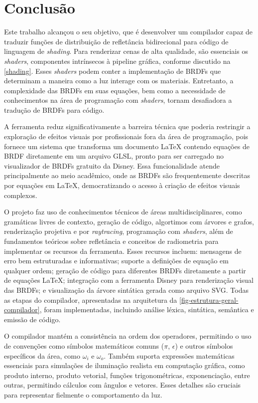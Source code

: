 
\chapter{Conclusão} \label{chapter-conclusion}

Este trabalho alcançou o seu objetivo, que é desenvolver um compilador capaz de traduzir funções de distribuição de refletância bidirecional para código de linguagem de \textit{shading}. Para renderizar cenas de alta qualidade, são essenciais os \textit{shaders}, componentes intrínsecos à pipeline gráfica, conforme discutido na \autoref{shading}. Esses \textit{shaders} podem conter a implementação de BRDFs que determinam a maneira como a luz interage com os materiais. Entretanto, a complexidade das BRDFs em suas equações, bem como a necessidade de conhecimentos na área de programação com \textit{shaders}, tornam desafiadora a tradução de BRDFs para código.

A ferramenta reduz significativamente a barreira técnica que poderia restringir a exploração de efeitos visuais por profissionais fora da área de programação, pois fornece um sistema que transforma um documento \LaTeX{} contendo equações de BRDF diretamente em um arquivo GLSL, pronto para ser carregado no visualizador de BRDFs gratuito da Disney. Essa funcionalidade atende principalmente ao meio acadêmico, onde as BRDFs são frequentemente descritas por equações em \LaTeX{}, democratizando o acesso à criação de efeitos visuais complexos.

O projeto faz uso de conhecimentos técnicos de áreas multidisciplinares, como gramáticas livres de contexto, geração de código, algortimos com árvores e grafos, renderização projetiva e por \textit{raytracing}, programação com \textit{shaders}, além de fundamentos teóricos sobre refletância e conceitos de radiometria para implementar os recursos da ferramenta. Esses recursos incluem: mensagens de erro bem estruturadas e informativas; suporte a definições de equação em qualquer ordem; geração de código para diferentes BRDFs diretamente a partir de equações \LaTeX{}; integração com a ferramenta Disney para renderização visual das BRDFs; e visualização da árvore sintática gerada como arquivo SVG. Todas as etapas do compilador, apresentadas na arquitetura da \autoref{fig-estrutura-geral-compilador}, foram implementadas, incluindo análise léxica, sintática, semântica e emissão de código.

O compilador mantém a consistência na ordem dos operadores, permitindo o uso de convenções como símbolos matemáticos comuns ($\pi$, $\epsilon$) e outros símbolos específicos da área, como $\omega_i$ e $\omega_o$. Também suporta expressões matemáticas essenciais para simulações de iluminação realista em computação gráfica, como produto interno, produto vetorial, funções trigonométricas, exponenciação, entre outras, permitindo cálculos com ângulos e vetores. Esses detalhes são cruciais para representar fielmente o comportamento da luz.

